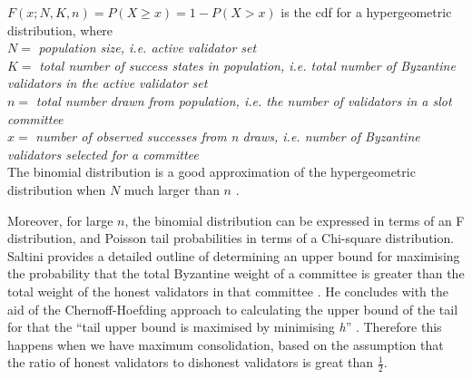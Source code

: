 \documentclass{article}
\begin{document}
\noindent $F (x; N, K, n) = P(X \geqslant x)  = 1 - P( X > x) $ is the
\gls{cdf} for a hypergeometric distribution, where \\ $N = $ \textit{
population size, i.e. active validator set}\\
$K = $ \textit{ total number of success states in population, i.e. total number
of Byzantine validators in the active validator set}  \\ $n = $ \textit{ total
  number drawn from population, i.e. the number of validators in a slot
committee} \\ $x = $ \textit{ number of observed successes from n draws, i.e.
number of Byzantine validators selected for a committee} \\

\noindent
The binomial distribution is a good approximation of the hypergeometric
distribution when $N$ much larger than $n$ \cite{chattamvelli}.
 
Moreover, for large $n$, the binomial distribution can be expressed in terms of
an F distribution, and Poisson tail probabilities in terms of a Chi-square
distribution.\\


Saltini provides a detailed outline of determining an upper bound for
maximising the probability that the total Byzantine weight of a committee is
greater than the total weight of the honest validators in that committee
\cite{Saltini2023}. He concludes with the aid of the Chernoff-Hoefding approach
to calculating the upper bound of the tail for  that the ``tail upper bound is
maximised by minimising \textit{h}'' \cite{Saltini2023}. Therefore this happens
when we have maximum consolidation, based on the assumption that the ratio of
honest validators to dishonest validators is great than $\frac{1}{2}$.
\end{document}

